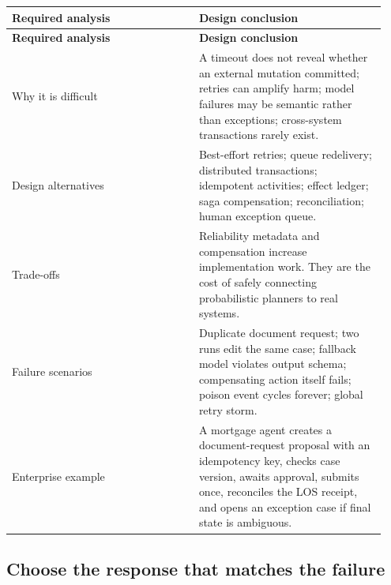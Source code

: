 \BookTableStart
\small
\begin{longtable}{@{}Y{0.4700\linewidth}Y{0.4700\linewidth}@{}}
\color{white}\bfseries \textbf{Required analysis} & \color{white}\bfseries \textbf{Design conclusion} \\
\endfirsthead
{}
\color{white}\bfseries \textbf{Required analysis} & \color{white}\bfseries \textbf{Design conclusion} \\
\endhead
Why it is difficult & A timeout does not reveal whether an external mutation committed; retries can amplify harm; model failures may be semantic rather than exceptions; cross-system transactions rarely exist. \\
Design alternatives & Best-effort retries; queue redelivery; distributed transactions; idempotent activities; effect ledger; saga compensation; reconciliation; human exception queue. \\
Trade-offs & Reliability metadata and compensation increase implementation work. They are the cost of safely connecting probabilistic planners to real systems. \\
Failure scenarios & Duplicate document request; two runs edit the same case; fallback model violates output schema; compensating action itself fails; poison event cycles forever; global retry storm. \\
Enterprise example & A mortgage agent creates a document-request proposal with an idempotency key, checks case version, awaits approval, submits once, reconciles the LOS receipt, and opens an exception case if final state is ambiguous. \\
\end{longtable}
\BookTableEnd

\subsection{Choose the response that matches the failure}

